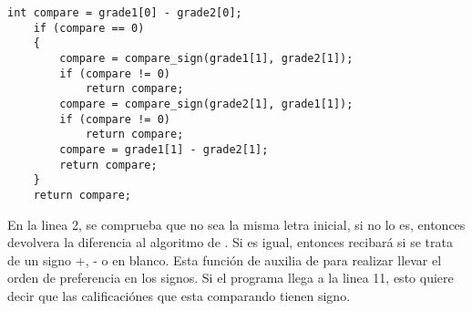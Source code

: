 \begin{lstlisting}[style=CStyle]
    int compare = grade1[0] - grade2[0];
    if (compare == 0)
    {
        compare = compare_sign(grade1[1], grade2[1]);
        if (compare != 0)
            return compare;
        compare = compare_sign(grade2[1], grade1[1]);
        if (compare != 0)
            return compare;
        compare = grade1[1] - grade2[1];
        return compare;
    }
    return compare;
\end{lstlisting}

En la linea 2, se comprueba que no sea la misma letra inicial, si no lo es, entonces devolvera la diferencia al algoritmo de . Si es igual, entonces recibará si se trata de un signo +, - o en blanco. Esta función de auxilia de  para realizar llevar el orden de preferencia en los signos. Si el programa llega a la linea 11, esto quiere decir que las calificaciónes que esta comparando tienen signo.